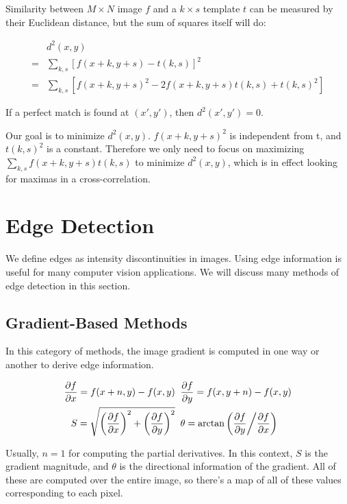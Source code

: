 \documentclass{article}
\begin{document}
\begin{multicols}{2}
Similarity between $M \times N$ image $f$ and a $k \times s$ template $t$ can be measured by their Euclidean distance, but the sum of squares itself will do:

\[
\begin{aligned}
  &d^2(x,y)\\
  =&\sum_{k,s}[f(x+k,y+s) - t(k,s)]^2 \\
  =&\sum_{k,s}[f(x+k,y+s)^2 -2f(x+k,y+s)t(k,s) + t(k,s)^2]
\end{aligned}
\]

If a perfect match is found at $(x',y')$, then $d^2(x',y') = 0$.

Our goal is to minimize $d^2(x,y)$. $f(x+k,y+s)^2$ is independent from t, and $t(k,s)^2$ is a constant. Therefore we only need to focus on maximizing $\sum_{k,s}f(x+k,y+s)t(k,s)$ to minimize $d^2(x,y)$, which is in effect looking for maximas in a cross-correlation.

\section{Edge Detection}

We define edges as intensity discontinuities in images. Using edge information is useful for many computer vision applications. We will discuss many methods of edge detection in this section.

\subsection{Gradient-Based Methods}

In this category of methods, the image gradient is computed in one way or another to derive edge information.

\[
\begin{aligned}
  \frac{\partial f}{\partial x} = f(x+n, y) - f(x,y) \;& \;\frac{\partial f}{\partial y} = f(x, y+n) - f(x,y)\\
  S = \sqrt{\left(\frac{\partial f}{\partial x}\right)^2 + \left(\frac{\partial f}{\partial y}\right)^2} \;&\; \theta = \arctan\left(\frac{\partial f}{\partial y} \middle/ \frac{\partial f}{\partial x}\right)
\end{aligned}
\]

Usually, $n=1$ for computing the partial derivatives. In this context, $S$ is the gradient magnitude, and $\theta$ is the directional information of the gradient. All of these are computed over the entire image, so there's a map of all of these values corresponding to each pixel.


\end{multicols}
\end{document}
